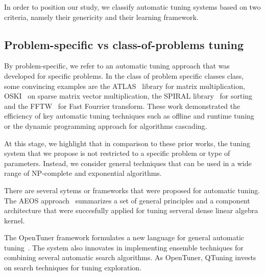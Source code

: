 \documentclass[10pt, conference, compsocconf]{IEEEtran}
\begin{document}

In order to position our study, we classify automatic tuning systems based on two criteria, namely
their genericity and their learning framework.


\subsection{Problem-specific vs class-of-problems tuning}

By problem-specific, we refer to an automatic tuning approach that was
developed for specific problems.  In the class of problem specific classes
class, some convincing examples are the ATLAS~\cite{ATLAS} library for matrix
multiplication, OSKI~\cite{Vuduc:2005zi} on sparse matrix vector
multiplication,  the SPIRAL library~\cite{Spiral} for sorting and the
FFTW~\cite{FFTW}  for Fast Fourrier transform. These work demonstrated the
efficiency of key automatic tuning techniques such as offline and runtime
tuning or the dynamic programming approach for algorithms cascading.


At this stage, we highlight that in comparison to these prior
works, the tuning system that we propose is not restricted to a specific
problem or type of parameters. Instead, we consider general techniques that can
be used in a wide range of NP-complete and exponential algorithms.

There are several sytems or frameworks that were proposed for automatic tuning.
The AEOS approach~\cite{AEOS} summarizes a set of general principles and a
component architecture that were succesfully applied for tuning  serveral dense
linear algebra kernel.


The OpenTuner framework formulates a new language for general automatic
tuning~\cite{DBLP:conf/IEEEpact/AnselKVRBOA14}.  The system also innovates in
implementing ensemble techniques for combining several automatic search
algorithms. As OpenTuner, QTuning invests on search techniques for tuning
exploration.
\end{document}

